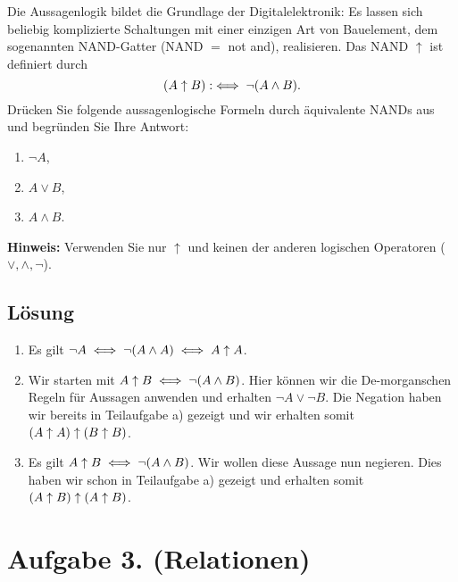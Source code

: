 \documentclass[german,12pt]{homework}
\DeclarePairedDelimiter{\enbrace}{(}{)}
\begin{document}
    \begin{problem}
        Die Aussagenlogik bildet die Grundlage der Digitalelektronik: Es lassen
        sich beliebig komplizierte Schaltungen mit einer einzigen Art von
        Bauelement, dem sogenannten NAND-Gatter (NAND \(=\) not and),
        realisieren. Das NAND \(\uparrow\) ist definiert durch
        \[\enbrace*{A \uparrow B} :\iff \lnot\enbrace*{A \land B}.\]
        Drücken Sie folgende aussagenlogische Formeln durch äquivalente NANDs
        aus und begründen Sie Ihre Antwort:
        \begin{enumerate}
            \item \({\lnot}A\),
            \item \(A \lor B\),
            \item \(A \land B\).
        \end{enumerate}

        \textbf{Hinweis:} \quad Verwenden Sie nur \(\uparrow\) und keinen der
        anderen logischen Operatoren (\(\lor, \land, \lnot\)).
    \end{problem}

    \subsection*{Lösung}
    \begin{enumerate}
        \item Es gilt \(\lnot{A} \iff \lnot\enbrace*{A \land A} \iff A \uparrow
        A\).
        \item Wir starten mit \(A \uparrow B \iff \lnot\enbrace*{A \land B}\).
        Hier können wir die De-morganschen Regeln für Aussagen anwenden und
        erhalten \(\lnot{A} \lor \lnot{B}\). Die Negation haben wir bereits in
        Teilaufgabe a) gezeigt und wir erhalten somit \(\enbrace*{A \uparrow A}
        \uparrow \enbrace*{B \uparrow B}\).
        \item Es gilt \(A \uparrow B \iff \lnot\enbrace*{A \land B}\). Wir
        wollen diese Aussage nun negieren. Dies haben wir schon in Teilaufgabe
        a) gezeigt und erhalten somit \(\enbrace*{A \uparrow B} \uparrow \enbrace*{A \uparrow B}\).
    \end{enumerate}

    \section*{Aufgabe 3. (Relationen)}
\end{document}
